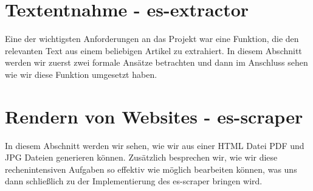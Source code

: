 

\chapter{Textentnahme - es-extractor}

Eine der wichtigsten Anforderungen an das Projekt war eine Funktion, die den relevanten Text aus einem beliebigen Artikel zu extrahiert. In diesem Abschnitt werden wir zuerst zwei formale Ansätze betrachten und dann im Anschluss sehen wie wir diese Funktion umgesetzt haben.





\chapter{Rendern von Websites - es-scraper}

In diesem Abschnitt werden wir sehen, wie wir aus einer HTML Datei PDF und JPG Dateien generieren können. Zusätzlich besprechen wir, wie wir diese rechenintensiven Aufgaben so effektiv wie möglich bearbeiten können, was uns dann schließlich zu der Implementierung des es-scraper bringen wird. 




